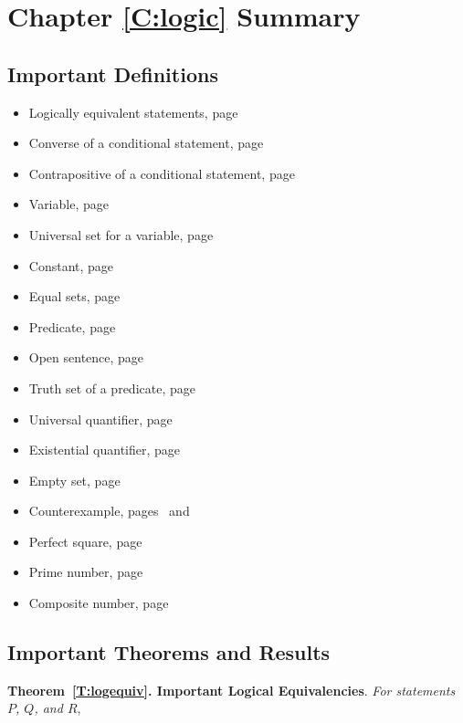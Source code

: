 \section{Chapter \ref{C:logic} Summary}

\subsection*{Important Definitions}
\begin{multicols}{2}
\begin{itemize}
\item Logically equivalent statements, page~\pageref*{D:logequiv}
\item Converse of a conditional statement, page~\pageref*{D:converse}
\item Contrapositive of a conditional statement, page~\pageref*{D:contrapositive}
\item Variable, page~\pageref*{D:universal}
\item Universal set for a variable, page~\pageref*{D:universal}
\item Constant, page~\pageref*{D:universal}
\item Equal sets, page~\pageref*{D:setequality}
\item Predicate, page~\pageref*{D:predicate}
\item Open sentence, page~\pageref*{D:predicate}
\item Truth set of a predicate, page~\pageref*{D:truthset}
\item Universal quantifier, page~\pageref*{D:every}
\item Existential quantifier, page~\pageref*{D:every}
\item Empty set, page~\pageref*{sym:empty}
\item Counterexample, pages~\pageref*{D:counterexample} and~\pageref*{D:counterexample2}
\item Perfect square, page~\pageref*{D:square}
\item Prime number, page~\pageref*{D:prime}
\item Composite number, page~\pageref*{D:prime}
\end{itemize}
\end{multicols}
\hbreak


\subsection*{Important Theorems and Results}
\textbf{Theorem~\ref{T:logequiv}. Important Logical Equivalencies}.
\emph{For statements $P$, $Q$, and $R$},

